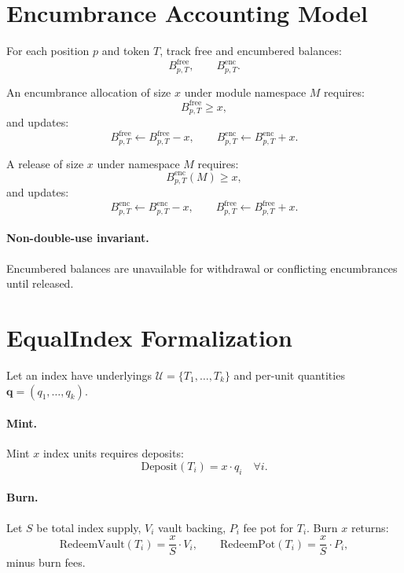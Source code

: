 \documentclass[version=preprint]{iacrcc}
\begin{document}
\section{Encumbrance Accounting Model}

For each position $p$ and token $T$, track free and encumbered balances:
\[
B^{\text{free}}_{p,T}, \qquad B^{\text{enc}}_{p,T}.
\]

An encumbrance allocation of size $x$ under module namespace $M$ requires:
\[
B^{\text{free}}_{p,T} \ge x,
\]
and updates:
\[
B^{\text{free}}_{p,T} \leftarrow B^{\text{free}}_{p,T} - x,
\qquad
B^{\text{enc}}_{p,T} \leftarrow B^{\text{enc}}_{p,T} + x.
\]

A release of size $x$ under namespace $M$ requires:
\[
B^{\text{enc}}_{p,T}(M) \ge x,
\]
and updates:
\[
B^{\text{enc}}_{p,T} \leftarrow B^{\text{enc}}_{p,T} - x,
\qquad
B^{\text{free}}_{p,T} \leftarrow B^{\text{free}}_{p,T} + x.
\]

\paragraph{Non-double-use invariant.}
Encumbered balances are unavailable for withdrawal or conflicting encumbrances until released.

\section{EqualIndex Formalization}

Let an index have underlyings $\mathcal{U}=\{T_1,\ldots,T_k\}$ and per-unit quantities $\mathbf{q}=(q_1,\ldots,q_k)$.

\paragraph{Mint.}
Mint $x$ index units requires deposits:
\[
\text{Deposit}(T_i) = x\cdot q_i \quad \forall i.
\]

\paragraph{Burn.}
Let $S$ be total index supply, $V_i$ vault backing, $P_i$ fee pot for $T_i$.
Burn $x$ returns:
\[
\text{RedeemVault}(T_i)=\frac{x}{S}\cdot V_i,
\qquad
\text{RedeemPot}(T_i)=\frac{x}{S}\cdot P_i,
\]
minus burn fees.
\end{document}
